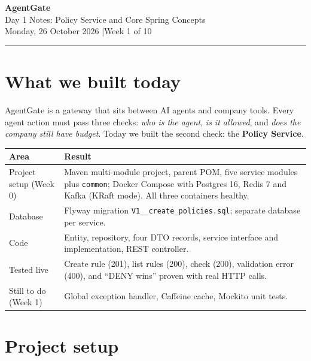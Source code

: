 \documentclass[11pt,a4paper]{article}
\newcommand{\code}[1]{\texttt{\small #1}}
\begin{document}
\begin{center}
  {\Huge\bfseries\color{accent} AgentGate}\\[0.4em]
  {\Large Day 1 Notes: Policy Service and Core Spring Concepts}\\[0.6em]
  {\normalsize Monday, 26 October 2026 \quad|\quad Week 1 of 10}
\end{center}
\vspace{0.5em}
\hrule
\vspace{0.8em}

\tableofcontents
\newpage

\section{What we built today}

AgentGate is a gateway that sits between AI agents and company tools. Every agent
action must pass three checks: \emph{who is the agent}, \emph{is it allowed}, and
\emph{does the company still have budget}. Today we built the second check: the
\textbf{Policy Service}.

\begin{tabular}{@{}p{3.2cm}p{11.8cm}@{}}
\toprule
\textbf{Area} & \textbf{Result} \\
\midrule
Project setup (Week 0) & Maven multi-module project, parent POM, five service modules plus \code{common}; Docker Compose with Postgres 16, Redis 7 and Kafka (KRaft mode). All three containers healthy. \\
Database & Flyway migration \code{V1\_\_create\_policies.sql}; separate database per service. \\
Code & Entity, repository, four DTO records, service interface and implementation, REST controller. \\
Tested live & Create rule (201), list rules (200), check (200), validation error (400), and ``DENY wins'' proven with real HTTP calls. \\
Still to do (Week 1) & Global exception handler, Caffeine cache, Mockito unit tests. \\
\bottomrule
\end{tabular}

\section{Project setup}
\end{document}
